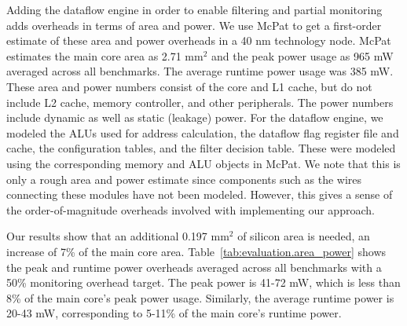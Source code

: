 Adding the dataflow engine in order to enable filtering and partial monitoring adds
overheads in terms of area and power. We use McPat \cite{mcpat-micro09} to get
a first-order estimate of these area and power overheads in a 40 nm technology
node. McPat estimates the main core area as 2.71 mm$^2$ and the peak power usage as
965 mW averaged across all benchmarks. The average runtime power usage was 385 
mW. These area and power numbers consist of the core and
L1 cache, but do not include L2 cache, memory controller, and other
peripherals. The power numbers include dynamic as well as static (leakage)
power. For the dataflow engine, we modeled the ALUs used for address
calculation, the dataflow flag register file and cache, the configuration
tables, and the filter decision table. These were modeled using the
corresponding memory and ALU objects in McPat. We
note that this is only a rough area and power estimate since components such as the
wires connecting these modules have not been modeled. However, this gives a
sense of the order-of-magnitude overheads involved with implementing our
approach.

Our results show that an additional 0.197 mm$^2$ of silicon area is needed, an
increase of 7\% of the main core area. Table~\ref{tab:evaluation.area_power}
shows the peak and runtime power overheads averaged across all benchmarks with
a 50\% monitoring overhead target. The peak power is 41-72 mW, which is
less than 8\% of the main core's peak power usage. Similarly, the average runtime power is 20-43
mW, corresponding to 5-11\% of the main core's runtime power.

